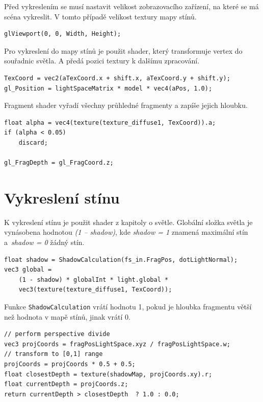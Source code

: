 \documentclass[thesis=M,czech]{FITthesis}[2019/12/23]
\begin{document}
Před vykreslením se musí nastavit velikost zobrazovacího zařízení, na které se má scéna vykreslit. V tomto případě velikost textury mapy stínů.

\begin{verbatim}
glViewport(0, 0, Width, Height);
\end{verbatim}

Pro vykreslení do mapy stínů je použit shader, který transformuje vertex do souřadnic světla. A předá pozici textury k dalšímu zpracování.

\begin{verbatim}
TexCoord = vec2(aTexCoord.x + shift.x, aTexCoord.y + shift.y);
gl_Position = lightSpaceMatrix * model * vec4(aPos, 1.0);
\end{verbatim}

Fragment shader vyřadí všechny průhledné fragmenty a zapíše jejich hloubku.

\begin{verbatim}
float alpha = vec4(texture(texture_diffuse1, TexCoord)).a;
if (alpha < 0.05)
    discard;

gl_FragDepth = gl_FragCoord.z;
\end{verbatim}

\section{Vykreslení stínu}

K vykreslení stínu je použit shader z kapitoly o světle. Globální složka světla je vynásobena hodnotou \textit{(1 -- shadow)}, kde \textit{shadow = 1} znamená maximální stín a~\textit{shadow = 0} žádný stín.

\begin{verbatim}
float shadow = ShadowCalculation(fs_in.FragPos, dotLightNormal);
vec3 global = 
    (1 - shadow) * globalInt * light.global * 
    vec3(texture(texture_diffuse1, TexCoord));
\end{verbatim}

Funkce \texttt{ShadowCalculation} vrátí hodnotu 1, pokud je hloubka fragmentu větší než hodnota v mapě stínů, jinak vrátí 0.

\begin{verbatim}
// perform perspective divide
vec3 projCoords = fragPosLightSpace.xyz / fragPosLightSpace.w;
// transform to [0,1] range
projCoords = projCoords * 0.5 + 0.5;
float closestDepth = texture(shadowMap, projCoords.xy).r; 
float currentDepth = projCoords.z;
return currentDepth > closestDepth  ? 1.0 : 0.0;
\end{verbatim}
\end{document}
